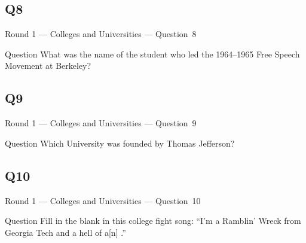 \documentclass[11pt]{beamer}
\begin{document}
\subsection*{Q8}
\begin{frame}[t]{Round 1 --- Colleges and Universities --- \mbox{Question 8}}
\vspace{-0.5em}
\begin{block}{Question}
What was the name of the student who led the 1964--1965 Free Speech Movement at Berkeley?
\end{block}
\end{frame}
\subsection*{Q9}
\begin{frame}[t]{Round 1 --- Colleges and Universities --- \mbox{Question 9}}
\vspace{-0.5em}
\begin{block}{Question}
Which University was founded by Thomas Jefferson?
\end{block}
\end{frame}
\subsection*{Q10}
\begin{frame}[t]{Round 1 --- Colleges and Universities --- \mbox{Question 10}}
\vspace{-0.5em}
\begin{block}{Question}
Fill in the blank in this college fight song: ``I'm a Ramblin' Wreck from Georgia Tech and a hell of a[n] \textunderscore{}\textunderscore{}\textunderscore{}\textunderscore{}\textunderscore{}.'' 
\end{block}
\end{frame}
\end{document}

